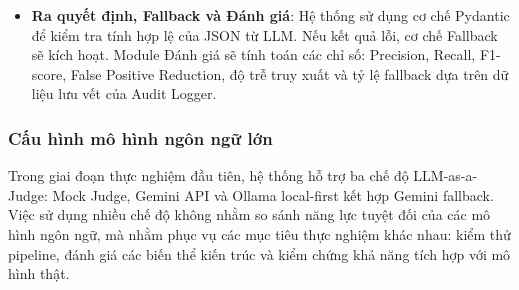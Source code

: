 \begin{itemize}[label=--]
\begin{table}[H]
\begin{tcolorbox}
\begin{lstlisting}[basicstyle=\small\ttfamily, columns=fullflexible, keepspaces=true]
  "severity": "P1 | P2 | P3 | none",
  "confidence": 0.0,
  "evidence": ["doc_id"],
  "reason": "Short explanation of the root cause",
  "recommended_action": "Recommended mitigation action"
}
\end{lstlisting}
\end{tcolorbox}
\caption{Cấu trúc dữ liệu đầu ra chi tiết của tầng thẩm định cảnh báo}
\label{tab:llm_detailed_json_schema}
\end{table}
\item \textbf{Ra quyết định, Fallback và Đánh giá}: Hệ thống sử dụng cơ chế Pydantic để kiểm tra tính hợp lệ của JSON từ LLM. Nếu kết quả lỗi, cơ chế Fallback sẽ kích hoạt. Module Đánh giá  sẽ tính toán các chỉ số: Precision, Recall, F1-score, False Positive Reduction, độ trễ truy xuất và tỷ lệ fallback dựa trên dữ liệu lưu vết của Audit Logger.
\end{itemize}
\subsubsection{Cấu hình mô hình ngôn ngữ lớn}
Trong giai đoạn thực nghiệm đầu tiên, hệ thống hỗ trợ ba chế độ LLM-as-a-Judge: Mock Judge, Gemini API và Ollama local-first kết hợp Gemini fallback. Việc sử dụng nhiều chế độ không nhằm so sánh năng lực tuyệt đối của các mô hình ngôn ngữ, mà nhằm phục vụ các mục tiêu thực nghiệm khác nhau: kiểm thử pipeline, đánh giá các biến thể kiến trúc và kiểm chứng khả năng tích hợp với mô hình thật.

